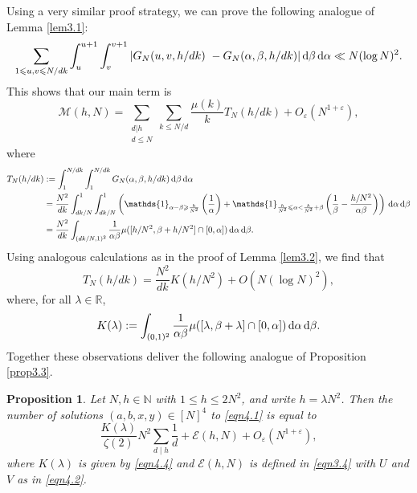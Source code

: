 \documentclass[12pt,reqno]{amsart}
\newtheorem{proposition}[theorem]{Proposition}
\theoremstyle{definition}
\theoremstyle{remark}
\numberwithin{equation}{section}
\renewcommand{\geq}{\geqslant}
\renewcommand{\leq}{\leqslant}
\def\eps{\varepsilon}
\def \cE {\mathcal E}
\def \cM {\mathcal M}
\def \N {\mathbb{N}}
\def \R {\mathbb{R}}
\def\d{{\,{\rm d}}}
\newcommand\1{\mathds{1}}
\begin{document}
Using a very similar proof strategy, we can prove the following analogue of Lemma \ref{lem3.1}:
    \begin{align*}
         \sum_{1 \leq u,v \leq N/dk}  \int_{u}^{u+1}\int_{v}^{v+1} | G_N(u,v, h/dk)  \ -G_N(\alpha,\beta, h/dk)| \d \beta \d \alpha \ll N(\log N)^2.
    \end{align*}
This shows that our main term is
\begin{equation*}
    \cM(h,N) = \sum_{\substack{d|h \\ d \leqslant N}}\sum_{k\leqslant N/d}\frac{\mu(k)}{k}T_N(h/dk) + O_\eps(N^{1+\eps}),
\end{equation*}
where
\begin{align*}
    T_N(h/dk) &:= \int_1^{N/dk} \int_1^{N/dk} G_N(\alpha, \beta, h/dk)  \d \beta \d \alpha \\
    & = \frac{N^2}{d k}  \int_{dk/N}^1 \int_{dk/N}^1 \left( \1_{\alpha - \beta \geq \frac{h}{N^2}} \left( \frac{1}{\alpha} \right) + \1_{\frac{h}{N^2}\leq \alpha < \frac{h}{N^2}+ \beta}\left( \frac{1}{\beta} - \frac{h/N^2}{\alpha \beta}\right) \right)\d \alpha\d \beta\\
    &= \frac{N^2}{dk}\int_{(dk/N,1)^2}\frac{1}{\alpha\beta}\mu([h/N^2,\beta+h/N^2]\cap [0,\alpha])\d\alpha\d\beta.
\end{align*}
Using analogous calculations as in the proof of Lemma \ref{lem3.2}, we find that
\begin{equation*}
    T_N(h/dk) = \frac{N^2}{dk}K(h/N^2) + O(N(\log N)^2),
\end{equation*}
where, for all $\lambda\in\R$,
\begin{equation}\label{eqn4.4}
    K(\lambda):= \int_{(0,1)^2}\frac{1}{\alpha\beta}\mu([\lambda,\beta+\lambda]\cap [0,\alpha])\d\alpha\d\beta.
\end{equation}
Together these observations deliver the following analogue of Proposition \ref{prop3.3}.
\begin{proposition}\label{prop4.1}
    Let $N,h\in\N$ with $1\leqslant h\leqslant 2N^2$, and write $h=\lambda N^2$. Then the number of solutions $(a,b,x,y)\in[N]^4$ to \eqref{eqn4.1} is equal to
    \begin{equation*}
        \frac {K(\lambda)}{\zeta(2)}N^2\sum_{d\mid h}\frac{1}{d} + \cE(h,N)+O_\eps(N^{1+\eps}),
    \end{equation*}
    where $K(\lambda)$ is given by \eqref{eqn4.4} and  $\cE(h,N)$ is defined in \eqref{eqn3.4} with $U$ and $V$ as in \eqref{eqn4.2}.
\end{proposition}
\end{document}
